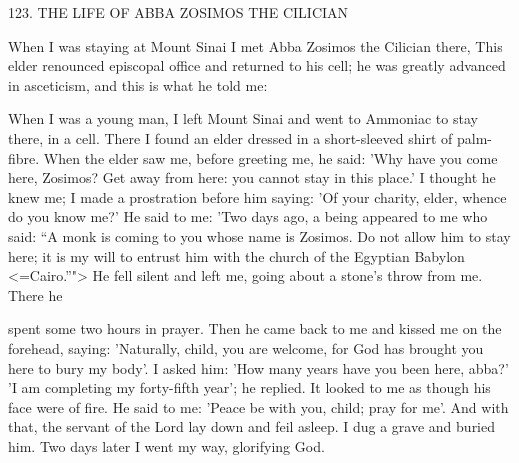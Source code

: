 123.
THE LIFE OF ABBA ZOSIMOS THE CILICIAN

When I was staying at Mount Sinai I met Abba Zosimos the
Cilician there, This elder renounced episcopal office and returned to
his cell; he was greatly advanced in asceticism, and this is what he
told me:

When I was a young man, I left Mount Sinai and went to
Ammoniac to stay there, in a cell.
There I found an elder dressed in
a short-sleeved shirt of palm-fibre.
When the elder saw me, before
greeting me, he said: 'Why have you come here, Zosimos? Get away
from here: you cannot stay in this place.' I thought he knew me; I
made a prostration before him saying: 'Of your charity, elder,
whence do you know me?' He said to me: 'Two days ago, a being
appeared to me who said: “A monk is coming to you whose name
is Zosimos.
Do not allow him to stay here; it is my will to entrust
him with the church of the Egyptian Babylon <=Cairo.”"> He fell
silent and left me, going about a stone's throw from me.
There he

spent some two hours in prayer.
Then he came back to me and
kissed me on the forehead, saying: 'Naturally, child, you are
welcome, for God has brought you here to bury my body'.
I asked
him: 'How many years have you been here, abba?' 'I am completing
my forty-fifth year'; he replied.
It looked to me as though his face
were of fire.
He said to me: 'Peace be with you, child; pray for me'.
And with that, the servant of the Lord lay down and feil asleep.
I
dug a grave and buried him.
Two days later I went my way,
glorifying God.

